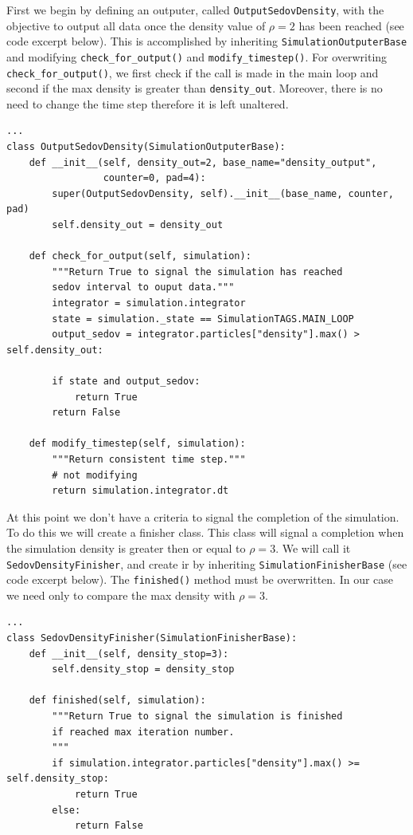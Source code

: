 First we begin by defining an outputer, called \lstinline{OutputSedovDensity}, with the objective to output
all data once the density value of $\rho=2$ has been reached (see code excerpt below). This
is accomplished by inheriting \lstinline{SimulationOutputerBase} and modifying
\lstinline{check_for_output()} and \lstinline{modify_timestep()}. For overwriting
\lstinline{check_for_output()}, we first check if the call is made in the main
loop and second if the max density is greater than \lstinline{density_out}. Moreover, there
is no need to change the time step therefore it is left unaltered.
\begin{lstlisting}
...
class OutputSedovDensity(SimulationOutputerBase):
    def __init__(self, density_out=2, base_name="density_output",
                 counter=0, pad=4):
        super(OutputSedovDensity, self).__init__(base_name, counter, pad)
        self.density_out = density_out

    def check_for_output(self, simulation):
        """Return True to signal the simulation has reached
        sedov interval to ouput data."""
        integrator = simulation.integrator
        state = simulation._state == SimulationTAGS.MAIN_LOOP
        output_sedov = integrator.particles["density"].max() > self.density_out:

        if state and output_sedov:
            return True
        return False

    def modify_timestep(self, simulation):
        """Return consistent time step."""
        # not modifying
        return simulation.integrator.dt
\end{lstlisting}

At this point we don't have a criteria to signal the completion of the simulation. To
do this we will create a finisher class. This class will signal a completion when the simulation 
density is greater then or equal to $\rho=3$. We will call it \lstinline{SedovDensityFinisher}, 
and create ir by inheriting \lstinline{SimulationFinisherBase} (see code excerpt below).
The \lstinline{finished()} method must be overwritten. In our case we need only to compare
the max density with $\rho=3$.
\begin{lstlisting}
...
class SedovDensityFinisher(SimulationFinisherBase):
    def __init__(self, density_stop=3):
        self.density_stop = density_stop

    def finished(self, simulation):
        """Return True to signal the simulation is finished
        if reached max iteration number.
        """
        if simulation.integrator.particles["density"].max() >= self.density_stop:
            return True
        else:
            return False
\end{lstlisting}


